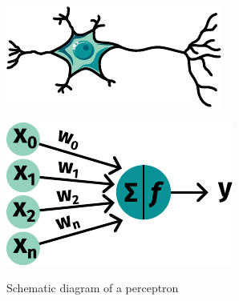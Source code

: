 \begin{marginfigure}%
	\includegraphics[width=\linewidth]{graphics/neuron}
    \caption[Schematic diagram of a neuron]{%
        Schematic diagram of a neuron.
        A typical neuron has a dendrites, a cell body, and a single axon; 
        the dendrites receive input signals from other neurons,
        and propagates output signals along the axon.
    }
    \label{fig:neuron}
\end{marginfigure}

\begin{marginfigure}%
	\includegraphics[width=\linewidth]{graphics/perceptron}
	\caption{Schematic diagram of a perceptron}
    \label{fig:perceptron}
\end{marginfigure}


